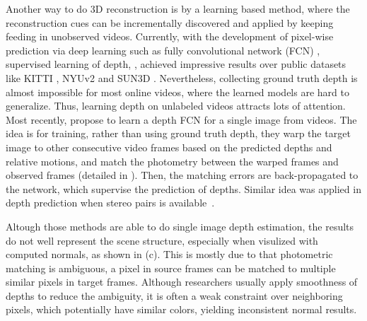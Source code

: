 Another way to do 3D reconstruction is by a learning based method, where the reconstruction cues can be incrementally discovered and applied by keeping feeding in unobserved videos. Currently, with the development of pixel-wise prediction via deep learning such as fully convolutional network (FCN) \cite{long2015fully}, supervised learning of depth, \eg \cite{eigen2014depth}, achieved impressive results over public datasets like KITTI \cite{geiger2012we}, NYUv2 \cite{silberman2012indoor} and SUN3D \cite{xiao2013sun3d}. 
Nevertheless, collecting ground truth depth is almost impossible for most online videos, where the learned models are hard to generalize. 
Thus, learning depth on unlabeled videos attracts lots of attention. Most recently,
\cite{zhou2017unsupervised} propose to learn a depth FCN for a single image from videos. The idea is for training, rather than using ground truth depth, they warp the target image to other consecutive video frames based on the predicted depths and relative motions, and match the photometry between the warped frames and observed frames (detailed in ). Then, the matching errors are back-propagated to the network, which supervise the prediction of depths. Similar idea was applied in depth prediction when stereo pairs is available~\cite{GargBR16,godard2016unsupervised}.


Altough those methods are able to do single image depth estimation, the results do not well represent the scene structure, especially when visulized with computed normals, as shown in (c).
This is mostly due to that photometric matching is ambiguous, \ie a pixel in source frames can be matched to multiple similar pixels in target frames. Although researchers usually apply smoothness of depths \cite{zhou2017unsupervised} to reduce the ambiguity, it is often a weak constraint over neighboring pixels, which potentially have similar colors, yielding inconsistent normal results.


